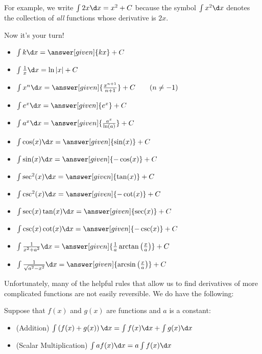 \documentclass[nooutcomes]{ximera}
\begin{document}
For example, we write $\int 2x \d x = x^2+C$ because the symbol $\int x^2 \d x$ denotes the collection of \emph{all} functions whose derivative is $2x$. 

Now it's your turn! 


\begin{theorem}\hfil
\begin{itemize}
\item $\int k \d x= \answer[given]{k x}+C$
\item $\int \frac{1}{x} \d x= \ln|x|+C$
\item $\int x^n \d x= \answer[given]{\frac{x^{n+1}}{n+1}}+C\qquad(n\ne-1)$
\item $\int e^x \d x= \answer[given]{e^x} + C$
\item $\int a^x \d x= \answer[given]{\frac{a^x}{\ln(a)}}+C$
\item $\int \cos(x) \d x = \answer[given]{\sin(x)} + C$
\item $\int \sin(x) \d x = \answer[given]{-\cos(x)} + C$  
\item $\int \sec^2(x) \d x = \answer[given]{\tan(x)} + C$
\item $\int \csc^2(x) \d x = \answer[given]{-\cot(x)} + C$
\item $\int \sec(x)\tan(x) \d x = \answer[given]{\sec(x)} + C$
\item $\int \csc(x)\cot(x) \d x = \answer[given]{-\csc(x)} + C$
\item $\int \frac{1}{x^2+a^2}\d x = \answer[given]{\frac{1}{a}\arctan\left(\frac{x}{a}\right)} + C$
\item $\int \frac{1}{\sqrt{a^2-x^2}}\d x= \answer[given]{\arcsin\left(\frac{x}{a}\right)}+C$
\end{itemize}
\end{theorem}


Unfortunately, many of the helpful rules that allow us to find derivatives of more complicated functions are not easily reversible.  We do have the following:

\begin{theorem} 
Suppose that $f(x)$ and $g(x)$ are functions and $a$ is a constant:
\begin{itemize}
\item (Addition) $\int \left(f(x) + g(x) \right) \d x = \int f(x) \d x+\int g(x)  \d x$
\item (Scalar Multiplication) $\int a f(x) \d x = a \int f(x) \d x$
\end{itemize}
\end{theorem}
\end{document}
